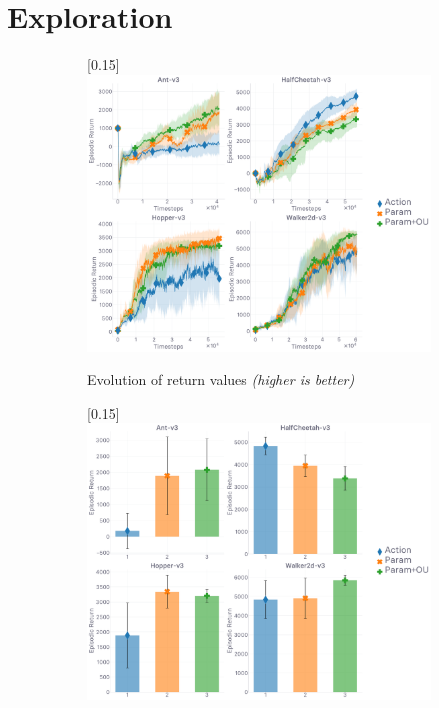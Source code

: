 \section{Exploration}
\label{ablationexplo}

\begin{figure}[H]
  \center
  \begin{subfigure}[t]{0.49\textwidth}
    \center\scalebox{0.15}[0.15]{\includegraphics{Plots/fig21_explo_ablation_4envs/plots_eval_env_ret_plot.pdf}}
    \caption{Evolution of return values \textit{(higher is better)}}
  \end{subfigure}
  \begin{subfigure}[t]{0.49\textwidth}
    \center\scalebox{0.15}[0.15]{\includegraphics{Plots/fig21_explo_ablation_4envs/plots_eval_env_ret_barplot.pdf}}

\end{subfigure}
\end{figure}
